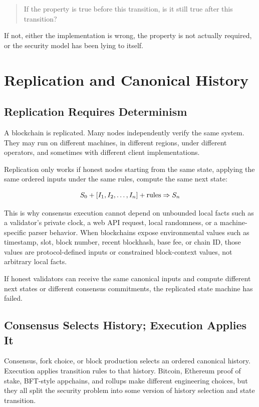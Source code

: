 \begin{quote}
If the property is true before this transition, is it still true after this transition?
\end{quote}

If not, either the implementation is wrong, the property is not actually required, or the security model has been lying to itself.

\section{Replication and Canonical History}

\subsection{Replication Requires Determinism}

A blockchain is replicated. Many nodes independently verify the same system. They may run on different machines, in different regions, under different operators, and sometimes with different client implementations.

Replication only works if honest nodes starting from the same state, applying the same ordered inputs under the same rules, compute the same next state:

\[
S_0 + [I_1,I_2,\ldots,I_n] + \text{rules}
\Rightarrow S_n
\]

This is why consensus execution cannot depend on unbounded local facts such as a validator's private clock, a web API request, local randomness, or a machine-specific parser behavior. When blockchains expose environmental values such as timestamp, slot, block number, recent blockhash, base fee, or chain ID, those values are protocol-defined inputs or constrained block-context values, not arbitrary local facts.

\begin{principlebox}[Determinism]
If honest validators can receive the same canonical inputs and compute different next states or different consensus commitments, the replicated state machine has failed.
\end{principlebox}

\subsection{Consensus Selects History; Execution Applies It}

Consensus, fork choice, or block production selects an ordered canonical history. Execution applies transition rules to that history. Bitcoin, Ethereum proof of stake, BFT-style appchains, and rollups make different engineering choices, but they all split the security problem into some version of history selection and state transition.

